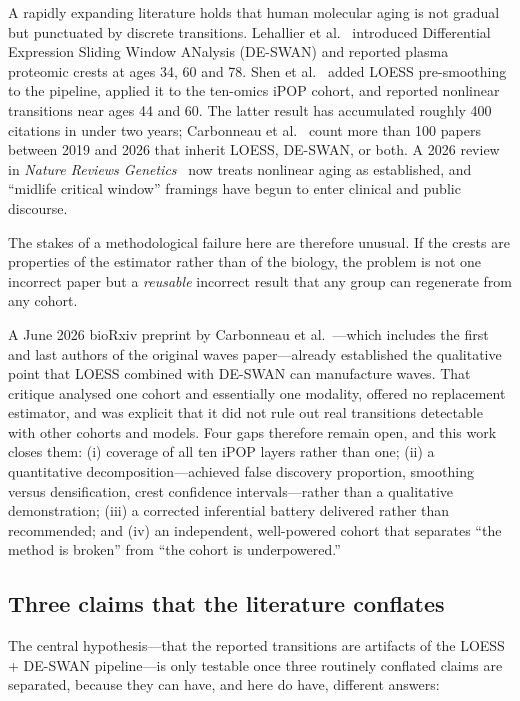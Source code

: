 \documentclass{article}
\begin{document}
A rapidly expanding literature holds that human molecular aging is not gradual but punctuated by discrete transitions. Lehallier et al.~\cite{lehallier2019} introduced Differential Expression Sliding Window ANalysis (DE-SWAN) and reported plasma proteomic crests at ages 34, 60 and 78. Shen et al.~\cite{shen2024} added LOESS pre-smoothing to the pipeline, applied it to the ten-omics iPOP cohort, and reported nonlinear transitions near ages 44 and 60. The latter result has accumulated roughly 400 citations in under two years; Carbonneau et al.~\cite{carbonneau2026} count more than 100 papers between 2019 and 2026 that inherit LOESS, DE-SWAN, or both. A 2026 review in \emph{Nature Reviews Genetics}~\cite{nrg2026} now treats nonlinear aging as established, and ``midlife critical window'' framings have begun to enter clinical and public discourse.

The stakes of a methodological failure here are therefore unusual. If the crests are properties of the estimator rather than of the biology, the problem is not one incorrect paper but a \emph{reusable} incorrect result that any group can regenerate from any cohort.

A June 2026 bioRxiv preprint by Carbonneau et al.~\cite{carbonneau2026}---which includes the first and last authors of the original waves paper---already established the qualitative point that LOESS combined with DE-SWAN can manufacture waves. That critique analysed one cohort and essentially one modality, offered no replacement estimator, and was explicit that it did not rule out real transitions detectable with other cohorts and models. Four gaps therefore remain open, and this work closes them: (i) coverage of all ten iPOP layers rather than one; (ii) a quantitative decomposition---achieved false discovery proportion, smoothing versus densification, crest confidence intervals---rather than a qualitative demonstration; (iii) a corrected inferential battery delivered rather than recommended; and (iv) an independent, well-powered cohort that separates ``the method is broken'' from ``the cohort is underpowered.''

\subsection{Three claims that the literature conflates}

The central hypothesis---that the reported transitions are artifacts of the LOESS + DE-SWAN pipeline---is only testable once three routinely conflated claims are separated, because they can have, and here do have, different answers:
\end{document}
